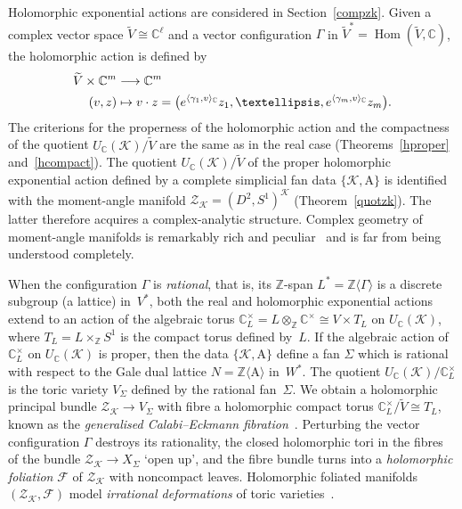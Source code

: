 \documentclass[a4paper]{amsart}
\theoremstyle{definition}
\theoremstyle{remark}
\numberwithin{equation}{section}
\def\C{\mathbb C}
\def\Z{\mathbb Z}
\def\sK{\mathcal K}
\newcommand{\mb}[1]{{\textbf {\textit#1}}}
\def\Hom{\mathop{\mathrm{Hom}}}
\newcommand{\zk}{\mathcal Z_{\mathcal K}}
\newcommand{\<}{\langle}
\renewcommand{\>}{\rangle}
\begin{document}
Holomorphic exponential actions are considered in Section~\ref{compzk}. Given a complex vector space $\widetilde V\cong\C^\ell$ and a vector configuration $\Gamma$ in $\widetilde V^*=\Hom(\widetilde V,\C)$, the holomorphic action is defined by
\[
\begin{aligned}
  \widetilde V\times\C^m&\longrightarrow\C^m\\
  (\mb v,\mb z)&\mapsto \mb v\cdot\mb z=\bigl(e^{\langle\gamma_1,\mb
  v\rangle_\C}z_1,\ldots,e^{\langle\gamma_m,\mb v\rangle_\C}z_m\bigr).
\end{aligned}
\]
The criterions for the properness of the holomorphic action and the compactness of the quotient $U_\C(\sK)/\widetilde V$ are the same as in the real case (Theorems~\ref{hproper} and~\ref{hcompact}). The quotient $U_\C(\sK)/\widetilde V$ of the proper holomorphic exponential action defined by a complete simplicial fan data $\{\mathcal K,\mathrm A\}$ is identified with the moment-angle manifold $\zk=(D^2,S^1)^\sK$ (Theorem~\ref{quotzk}). The latter therefore acquires a complex-analytic structure. Complex geometry of moment-angle manifolds is remarkably rich and peculiar~\cite{pa-us12,p-u-v16,i-k-p22} and is far from being understood completely.

When the configuration $\Gamma$ is \emph{rational}, that is, its $\Z$-span $L^*=\Z\langle\Gamma\rangle$ is a discrete subgroup (a lattice) in~$V^*$, both the real and holomorphic exponential actions extend to an action of the algebraic torus $\C^\times_L=L\otimes_\Z\C^\times\cong V\times T_L$ on $U_\C(\sK)$, where $T_L=L\times_\Z S^1$ is the compact torus defined by~$L$. If the algebraic action of $\C^\times_L$ on $U_\C(\sK)$ is proper, then the data $\{\sK,\mathrm A\}$ define a fan $\Sigma$ which is rational with respect to the Gale dual lattice $N=\Z\langle\mathrm  A\rangle$ in~$W^*$. The quotient $U_\C(\sK)/\C^\times_L$ is the toric variety $V_\Sigma$ defined by the rational fan~$\Sigma$. We obtain a holomorphic principal bundle $\zk\to V_\Sigma$ with fibre a holomorphic compact torus $\C^\times_L/\widetilde V\cong T_L$, known as the \emph{generalised Calabi--Eckmann fibration}~\cite{lo-ni96, lo-ve97, me-ve04}. Perturbing the vector configuration $\Gamma$ %
destroys its rationality, the closed holomorphic tori in the fibres of the bundle $\zk\to X_\Sigma$ `open up', and the fibre bundle turns into a \emph{holomorphic foliation} $\mathcal F$ of $\zk$ with noncompact leaves. Holomorphic foliated manifolds $(\zk,\mathcal F)$ model \emph{irrational deformations} of toric varieties~\cite{ba-pr01, ba-za15, ra-zu19, k-l-m-v21, i-k-p22, ba-pr23}.
\end{document}
